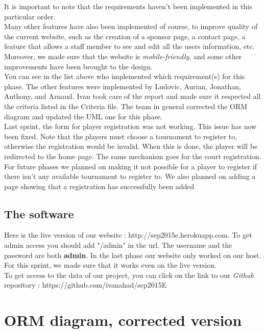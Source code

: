 \documentclass[a4paper, 12pt]{article}
\begin{document}
It is important to note that the requirements haven't been implemented in this particular order.\\

Many other features have also been implemented of course, to improve quality of the current website, such as the creation of a sponsor page, a contact page, a feature that allows a staff member to see and edit all the users information, etc. Moreover, we made sure that the website is \textit{mobile-friendly}, and some other improvements have been brought to the design.\\

You can see in the list above who implemented which requirement(s) for this phase. The other features were implemented by Ludovic, Aurian, Jonathan, Anthony, and Arnaud. Ivan took care of the report and made sure it respected all the criteria listed in the Criteria file. The team in general corrected the ORM diagram and updated the UML one for this phase. \\

Last sprint, the form for player registration was not working. This issue has now been fixed. Note that the players must choose a tournament to register to, otherwise the registration would be invalid. When this is done, the player will be redirected to the home page. The same mechanism goes for the court registration.  For future phases we planned on making it not possible for a player to register if there isn't any available tournament to register to. We also planned on adding a page showing that a registration has successfully been added\\

\subsection{The software}

Here is the live version of our website : http://sep2015e.herokuapp.com.  To get admin access you should add "/admin" in the url. The username and the password are both \textbf{admin}. In the last phase our website only worked on our host. For this sprint, we made sure that it works even on the live version.\\

To get access to the data of our project, you can click on the link to our \textit{Github} repository : https://github.com/ivanahad/sep2015E\\ 

\section{ORM diagram, corrected version}
\end{document}
